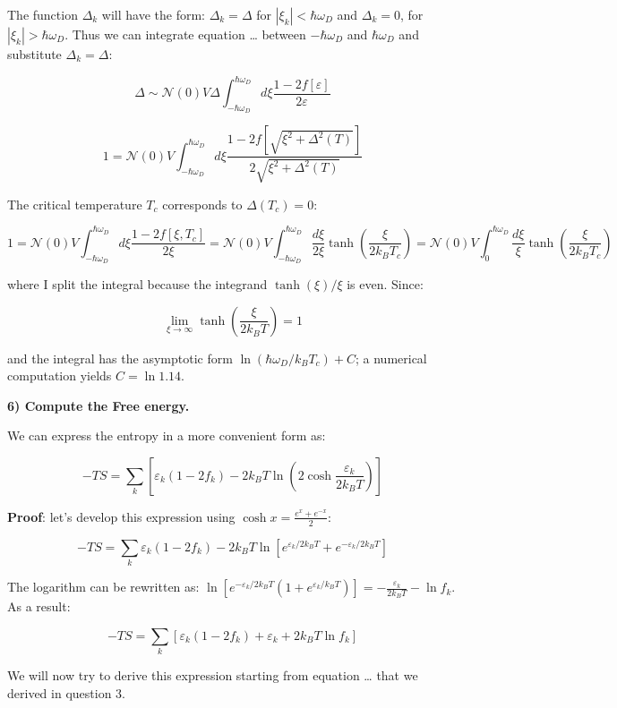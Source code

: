 The function \(\Delta_k\) will have the form: \(\Delta_k = \Delta\) for
\(|\xi_k| < \hbar \omega_D\) and \(\Delta_k = 0\), for
\(|\xi_k| > \hbar \omega_D\). Thus we can integrate equation \ldots{}
between \(-\hbar \omega_D\) and \(\hbar \omega_D\) and substitute
\(\Delta_k = \Delta\):

\[\Delta \sim \mathcal{N}(0) V \Delta \int_{-\hbar \omega_D}^{\hbar \omega_D} d\xi \frac{1 - 2 f[\varepsilon]}{2\varepsilon}\]

\[ 1 = \mathcal{N}(0) V \int_{-\hbar \omega_D }^{\hbar \omega_D} d\xi \frac{1 - 2 f[\sqrt{\xi^2 + \Delta^2(T)}]}{2\sqrt{\xi^2 + \Delta^2(T)}}\]

The critical temperature \(T_c\) corresponds to \(\Delta(T_c) = 0\):

\[ 1 = \mathcal{N}(0) V \int_{-\hbar \omega_D }^{\hbar \omega_D} d\xi \frac{1 - 2 f[\xi,T_c]}{2\xi} = \mathcal{N}(0) V \int_{-\hbar\omega_D}^{\hbar \omega_D} \frac{d\xi}{2\xi} \tanh\left(\frac{\xi}{2k_B T_c}\right) = \mathcal{N}(0) V \int_0^{\hbar \omega_D} \frac{d\xi}{\xi} \tanh\left(\frac{\xi}{2k_B T_c}\right) \]

where I split the integral because the integrand \(\tanh(\xi)/\xi\) is
even. Since:

\[ \lim_{\xi \rightarrow \infty} \tanh\left(\frac{\xi}{2k_B T}\right) = 1\]

and the integral has the asymptotic form
\(\ln (\hbar \omega_D/k_B T_c) + C\); a numerical computation yields
\(C = \ln 1.14\).

\textbf{6) Compute the Free energy.}

We can express the entropy in a more convenient form as:

\[- TS = \sum_k \left[\varepsilon_k (1 - 2 f_k) - 2 k_B T \ln \left(2 \cosh \frac{\varepsilon_k}{2 k_B T}\right) \right]\]

\textbf{Proof}: let's develop this expression using
\(\cosh x = \frac{e^x + e^{-x}}{2}\):

\[ - TS = \sum_k \varepsilon_k (1 - 2 f_k) - 2 k_B T \ln [e^{\varepsilon_k/2 k_B T}+e^{-\varepsilon_k/2 k_B T}]\]

The logarithm can be rewritten as:
\(\ln [e^{-\varepsilon_k/2 k_B T}(1+e^{\varepsilon_k/k_B T})] = -\frac{\varepsilon_k}{2 k_B T} - \ln f_k\).
As a result:

\[ -TS = \sum_k \left[\varepsilon_k (1 - 2 f_k) + \varepsilon_k + 2 k_B T \ln f_k \right]\]

We will now try to derive this expression starting from equation
\ldots{} that we derived in question 3.

